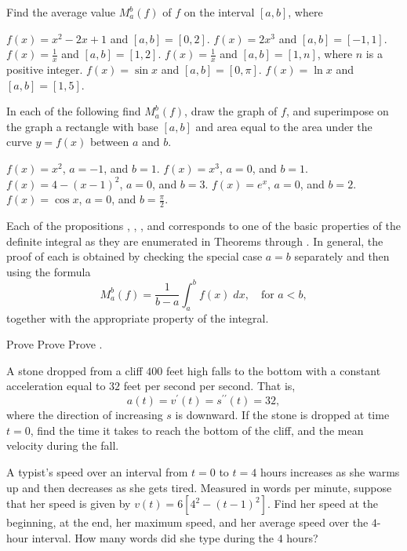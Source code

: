 \begin{exercises}

Find the average value $M_a^b(f)$
of $f$ on the interval $[a,b]$, where
\begin{exenum}
\x
$f(x) = x^2-2x+1$ and $[a,b] = [0,2]$.
\x
$f(x) = 2x^3$ and $[a,b] = [-1,1]$.
\x
$f(x) = \frac1x$ and $[a,b] = [1,2]$.
\x
$f(x) = \frac1x$ and $[a,b] = [1,n]$,
where $n$ is a positive integer.
\x
$f(x) = \sin x$ and $[a,b] = [0,\pi]$.
\x
$f(x) = \ln x$ and $[a,b] = [1,5]$.
\end{exenum}

In each of the following find $M_a^b(f)$,
draw the graph of $f$, and superimpose
on the graph a rectangle with base $[a,b]$
and area equal to the area under the curve
$y=f(x)$ between $a$ and $b$.
\begin{exenum}
\x
$f(x) = x^2$, $a = -1$, and $b = 1$.
\x
$f(x) = x^3$, $a = 0$, and $b = 1$.
\x
$f(x) = 4-(x-1)^2$, $a = 0$, and $b = 3$.
\x
$f(x) = e^x$, $a=0$, and $b=2$.
\x
$f(x) = \cos x$, $a=0$, and $b=\frac{\pi}2$.
\end{exenum}

Each of the propositions
, , ,
and  corresponds to one of the
basic properties of the definite integral
as they are enumerated in Theorems
 through .
In general, the proof of each is obtained by
checking the special case $a=b$
separately and then using the formula
\[
M_a^b(f) = \frac1{b-a} \int_a^b f(x)\;dx,
\quad \mbox{for $a<b$}
,
\]
together with the appropriate property
of the integral.
\begin{exenum}
\x
Prove 
\x
Prove 
\x
Prove .
\end{exenum}

A stone dropped from a cliff $400$ feet high
falls to the bottom with a constant
acceleration equal to $32$ feet per second per second.
That is,
\[
a(t) = v^\prime(t) = s^{\prime\prime}(t) = 32
,
\]
where the direction of increasing $s$ is downward.
If the stone is dropped at time $t=0$,
find the time it takes to reach the bottom of the cliff,
and the mean velocity during the fall.

A typist's speed over an interval from $t=0$
to $t=4$ hours increases as she warms up
and then decreases as she gets tired.
Measured in words per minute,
suppose that her speed is given by
$v(t) = 6[4^2-(t-1)^2]$.
Find her speed at the beginning, at the end,
her maximum speed, and her average speed
over the $4$-hour interval.
How many words did she type during the $4$
hours?


\end{exercises}
